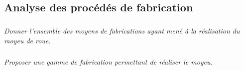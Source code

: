\documentclass[10pt,fleqn]{article} %
\begin{document}
\subsection*{Analyse des procédés de fabrication}
\subparagraph{}
\textit{Donner l'ensemble des moyens de fabrications ayant mené à la réalisation du moyeu de roue.}

\subparagraph{}
\textit{Proposer une gamme de fabrication permettant de réaliser le moyeu.}





\begin{center}

\end{center}
\end{document}
